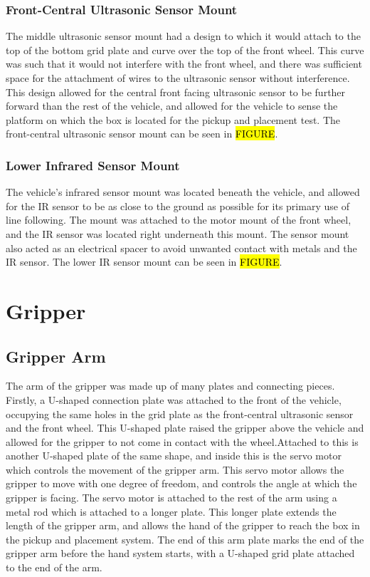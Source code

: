 \documentclass[11pt]{report}
\begin{document}
\subsubsection{Front-Central Ultrasonic Sensor Mount}
The middle ultrasonic sensor mount had a design to which it would attach to the top of the bottom grid plate and curve over the top of the front wheel. This curve was such that it would not interfere with the front wheel, and there was sufficient space for the attachment of wires to the ultrasonic sensor without interference. This design allowed for the central front facing ultrasonic sensor to be further forward than the rest of the vehicle, and allowed for the vehicle to sense the platform on which the box is located for the pickup and placement test. The front-central ultrasonic sensor mount can be seen in \hl{FIGURE}.

\subsubsection{Lower Infrared Sensor Mount}
The vehicle’s infrared sensor mount was located beneath the vehicle, and allowed for the \gls{IR} sensor to be as close to the ground as possible for its primary use of line following. The mount was attached to the motor mount of the front wheel, and the \gls{IR} sensor was located right underneath this mount. The sensor mount also acted as an electrical spacer to avoid unwanted contact with metals and the \gls{IR} sensor. The lower \gls{IR} sensor mount can be seen in \hl{FIGURE}. 

\section{Gripper}\label{sec:gripper}
\subsection{Gripper Arm}
The arm of the gripper was made up of many plates and connecting pieces. Firstly, a U-shaped connection plate was attached to the front of the vehicle, occupying the same holes in the grid plate as the front-central ultrasonic sensor and the front wheel. This U-shaped plate raised the gripper above the vehicle and allowed for the gripper to not come in contact with the wheel.Attached to this is another U-shaped plate of the same shape, and inside this is the servo motor which controls the movement of the gripper arm. This servo motor allows the gripper to move with one degree of freedom, and controls the angle at which the gripper is facing. The servo motor is attached to the rest of the arm using a metal rod which is attached to a longer plate. This longer plate extends the length of the gripper arm, and allows the hand of the gripper to reach the box in the pickup and placement system. The end of this arm plate marks the end of the gripper arm before the hand system starts, with a U-shaped grid plate attached to the end of the arm. 
\end{document}
